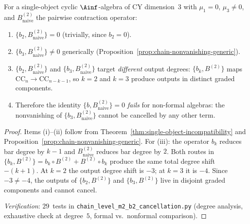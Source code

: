 \begin{corollary}
\label{cor:no-naive-cross-degree}
\ClaimStatusProvedHere{}
For a single-object cyclic $\Ainf$-algebra of CY dimension~$3$
with $\mu_1 = 0$, $\mu_3 \neq 0$, and $B^{(2)}_{\mathrm{naive}}$
the pairwise contraction operator:
\begin{enumerate}[label=\textup{(\roman*)}]
 \item $\{b_2, B^{(2)}_{\mathrm{naive}}\} = 0$ (trivially, since
  $b_2 = 0$).
 \item $\{b_3, B^{(2)}_{\mathrm{naive}}\} \neq 0$ generically
  (Proposition~\ref{prop:chain-nonvanishing-generic}).
 \item $\{b_2, B^{(2)}_{\mathrm{naive}}\}$ and
  $\{b_3, B^{(2)}_{\mathrm{naive}}\}$ target \emph{different}
  output degrees: $\{b_k, B^{(2)}\}$ maps
  $\mathrm{CC}_n \to \mathrm{CC}_{n-k-1}$, so $k = 2$ and
  $k = 3$ produce outputs in distinct graded components.
 \item Therefore the identity
  $\{b, B^{(2)}_{\mathrm{naive}}\} = 0$ \emph{fails} for
  non-formal algebras: the nonvanishing of $\{b_3, B^{(2)}_{\mathrm{naive}}\}$
  cannot be cancelled by any other term.
\end{enumerate}
\end{corollary}

\begin{proof}
Items (i)--(ii) follow from
Theorem~\ref{thm:single-object-incompatibility} and
Proposition~\ref{prop:chain-nonvanishing-generic}.  For (iii):
the operator $b_k$ reduces bar degree by $k - 1$ and
$B^{(2)}_{\mathrm{naive}}$ reduces bar degree by $2$.  Both
routes in $\{b_k, B^{(2)}\} = b_k \circ B^{(2)} + B^{(2)} \circ b_k$
produce the same total degree shift $-(k + 1)$.  At $k = 2$ the
output degree shift is $-3$; at $k = 3$ it is $-4$.  Since
$-3 \neq -4$, the outputs of $\{b_2, B^{(2)}\}$ and
$\{b_3, B^{(2)}\}$ live in disjoint graded components and
cannot cancel.

\noindent\textit{Verification}: $29$~tests in
\texttt{chain\_level\_m2\_b2\_cancellation.py}
(degree analysis, exhaustive check at degree~$5$, formal vs.\
nonformal comparison).
\end{proof}


